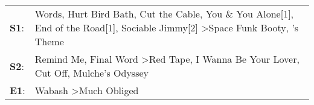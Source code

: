 \begin{supertabular}{p{0.03\textwidth}p{0.92\textwidth}}
 \textbf{S1}:  &  Words\textsuperscript{}, \enspace Hurt Bird Bath\textsuperscript{}, \enspace Cut the Cable\textsuperscript{}, \enspace You \& You Alone[1]\textsuperscript{}, \enspace End of the Road[1]\textsuperscript{}, \enspace Sociable Jimmy[2]\textsuperscript{} \textgreater \enspace Space Funk Booty\textsuperscript{}, 's Theme\textsuperscript{}  \enspace  \\
 \textbf{S2}:  &                                                                                                     Remind Me\textsuperscript{}, \enspace Final Word\textsuperscript{} \textgreater \enspace Red Tape\textsuperscript{}, \enspace I Wanna Be Your Lover\textsuperscript{}, \enspace Cut Off\textsuperscript{}, \enspace Mulche's Odyssey\textsuperscript{}  \enspace  \\
 \textbf{E1}:  &                                                                                                                                                                                                                                                                              Wabash\textsuperscript{} \textgreater \enspace Much Obliged\textsuperscript{}  \enspace  \\
\end{supertabular}
